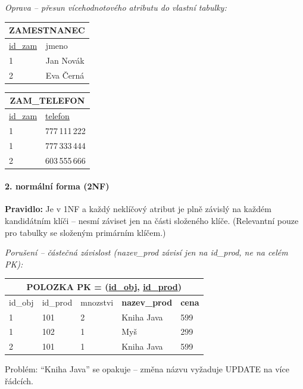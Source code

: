 \textit{Oprava -- přesun vícehodnotového atributu do vlastní tabulky:}
\begin{center}\footnotesize
\begin{tabular}{ll}
\toprule
\multicolumn{2}{c}{\textbf{ZAMESTNANEC}} \\
\midrule
\underline{id\_zam} & jmeno \\
1 & Jan Novák \\
2 & Eva Černá \\
\bottomrule
\end{tabular}
\quad
\begin{tabular}{ll}
\toprule
\multicolumn{2}{c}{\textbf{ZAM\_TELEFON}} \\
\midrule
\underline{id\_zam} & \underline{telefon} \\
1 & 777\,111\,222 \\
1 & 777\,333\,444 \\
2 & 603\,555\,666 \\
\bottomrule
\end{tabular}
\end{center}

\paragraph{2. normální forma (2NF)}
\textbf{Pravidlo:} Je v 1NF a každý neklíčový atribut je plně závislý na každém kandidátním klíči -- nesmí záviset jen na části složeného klíče.
(Relevantní pouze pro tabulky se složeným primárním klíčem.)

\smallskip
\textit{Porušení -- částečná závislost (nazev\_prod závisí jen na id\_prod, ne na celém PK):}
\begin{center}\footnotesize
\begin{tabular}{lllll}
\toprule
\multicolumn{5}{c}{\textbf{POLOZKA} \quad PK = (\underline{id\_obj}, \underline{id\_prod})} \\
\midrule
id\_obj & id\_prod & mnozstvi & \textbf{nazev\_prod} & \textbf{cena} \\
\midrule
1 & 101 & 2 & Kniha Java & 599 \\
1 & 102 & 1 & Myš & 299 \\
2 & 101 & 1 & Kniha Java & 599 \\
\bottomrule
\end{tabular}
\end{center}
Problém: ``Kniha Java'' se opakuje -- změna názvu vyžaduje UPDATE na více řádcích.

